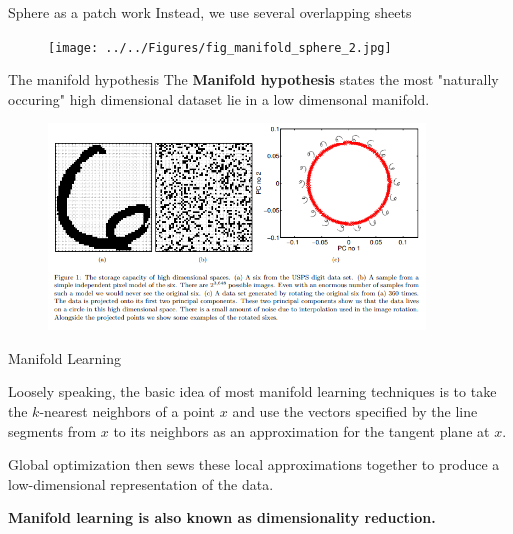\documentclass{beamer}
\begin{document}
\begin{frame}{Sphere as a patch work}
	Instead, we use several overlapping sheets 
\begin{figure}[h]
	\centering
	\texttt{[image: ../../Figures/fig\_manifold\_sphere\_2.jpg]}
\end{figure}		
	
	
\end{frame}




\begin{frame}{The manifold hypothesis}
	The \textbf{Manifold hypothesis} states the most "naturally occuring" high dimensional dataset lie in a low dimensonal manifold.
	
	\begin{figure}[h]
		\centering
		\includegraphics[width=10cm]{../../Figures/fig_manifold_lawrence.png}
	\end{figure}		
	
	
	
\end{frame}

\begin{frame}{Manifold Learning }
	
	Loosely speaking, the basic idea of most manifold learning techniques is to take the $k$-nearest neighbors of a point $x$ and use the vectors specified by the line segments from $x$ to its neighbors as an approximation for the tangent plane at $x$. 
	
	Global optimization then sews these local approximations together to produce a low-dimensional representation of the data. 
	
\begin{center}
\textbf{Manifold learning is also known as dimensionality reduction.} 
\end{center}
\end{frame}
\end{document}
